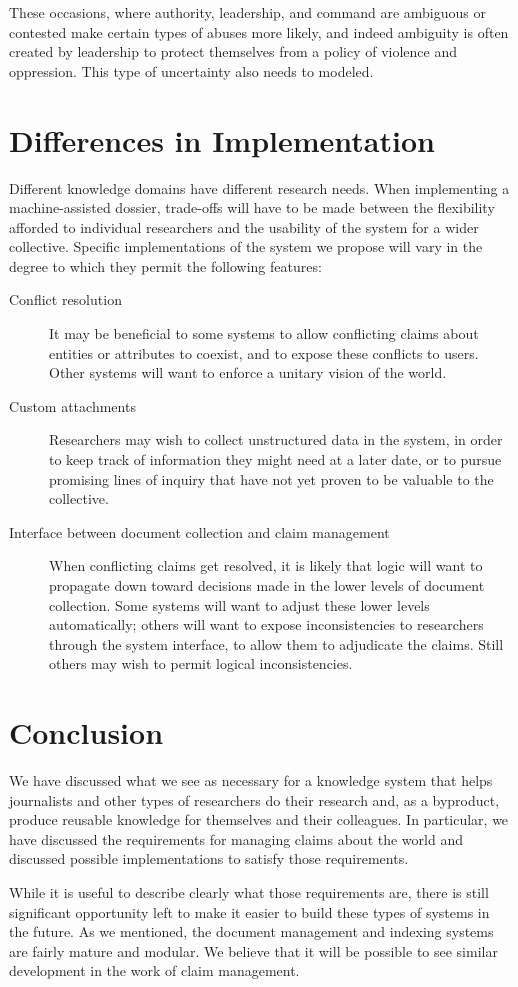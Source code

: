 \documentclass[format=siggraph, review=true]{acmart}
\begin{document}
These occasions, where authority, leadership, and command are
ambiguous or contested make certain types of abuses more likely, and
indeed ambiguity is often created by leadership to protect themselves
from a policy of violence and oppression. This type of uncertainty
also needs to modeled.

\section{Differences in Implementation}

Different knowledge domains have different research needs. When
implementing a machine-assisted dossier, trade-offs will have to be made
between the flexibility afforded to individual researchers and the
usability of the system for a wider collective. Specific implementations
of the system we propose will vary in the degree to which they permit
the following features:

\begin{description}
  \item [Conflict resolution] It may be beneficial to some systems to
    allow conflicting claims about entities or attributes to coexist,
    and to expose these conflicts to users. Other systems will want
    to enforce a unitary vision of the world.

  \item [Custom attachments] Researchers may wish to collect unstructured
    data in the system, in order to keep track of information they might
    need at a later date, or to pursue promising lines of inquiry that
    have not yet proven to be valuable to the collective.

  \item [Interface between document collection and claim management] When
    conflicting claims get resolved, it is likely that logic will
    want to propagate down toward decisions made in the lower levels
    of document collection. Some systems will want to adjust these lower
    levels automatically; others will want to expose inconsistencies to
    researchers through the system interface, to allow them to adjudicate
    the claims. Still others may wish to permit logical inconsistencies.
\end{description}

\section{Conclusion}
We have discussed what we see as necessary for a knowledge system that
helps journalists and other types of researchers do their research
and, as a byproduct, produce reusable knowledge for themselves and
their colleagues. In particular, we have discussed the requirements
for managing claims about the world and discussed possible
implementations to satisfy those requirements.

While it is useful to describe clearly what those requirements are,
there is still significant opportunity left to make it easier to build
these types of systems in the future. As we mentioned, the document
management and indexing systems are fairly mature and modular. We
believe that it will be possible to see similar development in the
work of claim management. 
\end{document}
